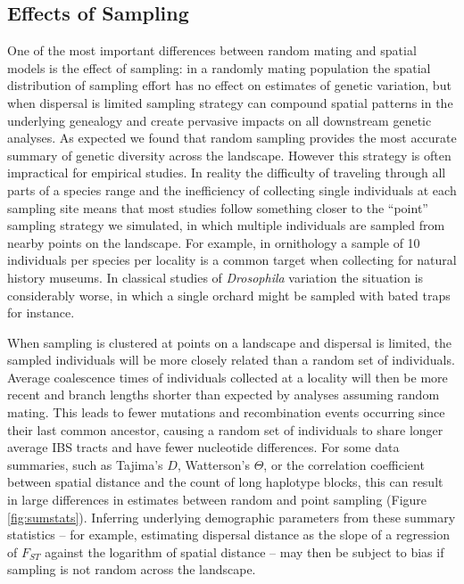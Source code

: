 \documentclass[11pt,twoside,lineno]{preprint}
\begin{document}
\subsection{Effects of Sampling}
One of the most important differences between random mating and spatial models is the effect of sampling: in a randomly mating population the spatial distribution of sampling effort has no effect on estimates of genetic variation, but when dispersal is limited sampling strategy can compound spatial patterns in the underlying genealogy and create pervasive impacts on all downstream genetic analyses. As expected we found that random sampling provides the most accurate summary of genetic diversity across the landscape. However this strategy is often impractical for empirical studies. In reality the difficulty of traveling through all parts of a species range and the inefficiency of collecting single individuals at each sampling site means that most studies follow something closer to the ``point'' sampling strategy we simulated, in which multiple individuals are sampled from nearby points on the landscape. For example, in ornithology a sample of 10 individuals per species per locality is a common target when collecting for natural history museums. In classical studies of \textit{Drosophila} variation the situation is considerably worse, in which a single orchard might be sampled with bated traps for instance. 

When sampling is clustered at points on a landscape and dispersal is limited, the sampled individuals will be more closely related than a random set of individuals. Average coalescence times of individuals collected at a locality will then be more recent and branch lengths shorter than expected by analyses assuming random mating. This leads to fewer mutations and recombination events occurring since their last common ancestor, causing a random set of individuals to share longer average IBS tracts and have fewer nucleotide differences. For some data summaries, such as Tajima's $D$, Watterson's $\Theta$, or the correlation coefficient between spatial distance and the count of long haplotype blocks, this can result in large differences in estimates between random and point sampling (Figure \ref{fig:sumstats}). Inferring underlying demographic parameters from these summary statistics -- for example, estimating dispersal distance as the slope of a regression of $F_{ST}$ against the logarithm of spatial distance \citep{Rousset1997} -- may then be subject to bias if sampling is not random across the landscape. 
\end{document}
